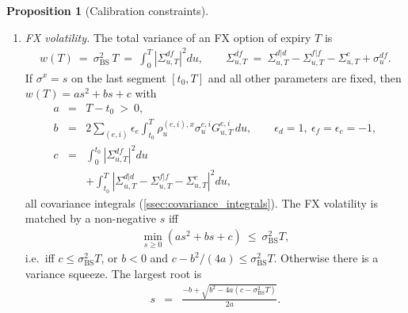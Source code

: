 \documentclass[11pt,english]{amsart}
\newcommand{\BS}{\mathrm{BS}}
\theoremstyle{definition}
\newtheorem{prop}{Proposition}
\begin{document}
\begin{prop}[Calibration constraints]
\begin{enumerate}
\item \emph{FX volatility.} The total variance of an FX option of expiry $T$ is
\begin{eqnarray}
  w(T) ~=~ \sigma_\BS^2\, T ~=~ \int_0^T\left|\Sigma^{df}_{u,T}\right|^2du , \qquad
  \Sigma^{df}_{u,T} ~=~ \Sigma^{d|d}_{u,T} - \Sigma^{f|f}_{u,T} - \Sigma^{c}_{u,T} + \sigma^{df}_u .
\end{eqnarray}
If $\sigma^x = s$ on the last segment $[t_0,T]$ and all other parameters are fixed, then $w(T) = as^2 + bs + c$ with
\begin{eqnarray*}
  a &=& T - t_0 ~>~ 0 , \\
  b &=& 2\sum_{(e,i)}\epsilon_e\int_{t_0}^T\rho^{(e,i),x}_u\sigma^{e,i}_uG^{e,i}_{u,T}\,du , \qquad \epsilon_d = 1,\ \epsilon_f = \epsilon_c = -1, \\
  c &=& \int_0^{t_0}\left|\Sigma^{df}_{u,T}\right|^2du \\
  & & + \int_{t_0}^T\left|\Sigma^{d|d}_{u,T} - \Sigma^{f|f}_{u,T} - \Sigma^c_{u,T}\right|^2du ,
\end{eqnarray*}
all covariance integrals (\autoref{ssec:covariance_integrals}). The FX volatility is matched by a non-negative $s$ iff
\begin{eqnarray*}
  \min_{s\ge0}\left(as^2+bs+c\right) ~\le~ \sigma_\BS^2T ,
\end{eqnarray*}
i.e.\ iff $c\le\sigma_\BS^2T$, or $b<0$ and $c - b^2/(4a)\le\sigma_\BS^2T$. Otherwise there is a variance squeeze. The largest root is
\begin{eqnarray}
  s &=& \frac{-b + \sqrt{b^2 - 4a\left(c - \sigma_\BS^2T\right)}}{2a} .
  \label{eq:cal_fx_root}
\end{eqnarray}
\end{enumerate}
\end{prop}
\end{document}
